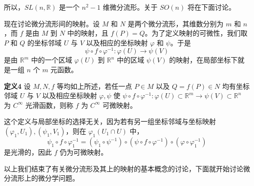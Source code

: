 所以，$SL(n,\mathbb R)$ 是一个 $n^2-1$ 维微分流形。关于 $SO(n)$ 将在下面讨论。

现在讨论微分流形间的映射。设 $M$ 和 $N$ 是两个微分流形，其维数分别为 $m$ 和 $n$，而 $f$ 是由 $M$ 到 $N$ 中的映射，且 $f(P)=Q$。为了定义映射的可微性，我们取 $P$ 和 $Q$ 的坐标邻域 $U$ 与 $V$ 以及相应的坐标映射 $\varphi$ 和 $\psi$。于是
\[
 \psi\circ f\circ\varphi^{-1}:\varphi(U)\longrightarrow\psi(V)
\]
是由 $\mathbb R^m$ 中的一个区域 $\varphi(U)$ 到 $\mathbb R^n$ 中的区域 $\psi(V)$ 的映射，在局部坐标下就是一组 $n$ 个 $m$ 元函数。

\noindent\textbf{定义4}\quad
设 $M,N,f$ 等均如上所述，若任一点 $P\in M$ 以及 $Q=f(P)\in N$ 均有坐标邻域 $U$ 与 $V$ 以及相应坐标映射 $\varphi,\psi$ 使 $\psi\circ f\circ\varphi^{-1}:\varphi(U)\subset\mathbb R^m\to\psi(V)\subset\mathbb R^n$ 为 $C^\infty$ 光滑函数，则称 $f$ 为 $C^\infty$ 可微映射。

这个定义与局部坐标的选择无关，因为若有另一组坐标邻域与坐标映射 $(\varphi_1,U_1),(\psi_1,V_1)$，则在 $\varphi_1(U_1\cap U)$ 中，
\[
 \psi_1\circ f\circ\varphi_1^{-1}
 =(\psi_1\circ\psi^{-1})\circ(\psi\circ f\circ\varphi^{-1})\circ(\varphi\circ\varphi_1^{-1})
\]
是光滑的，因此 $f$ 仍为可微映射。

以上我们结束了有关微分流形及其上的映射的基本概念的讨论，下面就开始讨论微分流形上的微分学问题。
